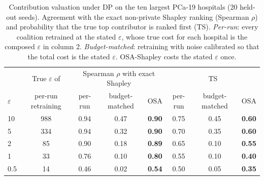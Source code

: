 \begin{table}[t]
\caption{Contribution valuation under DP on the ten largest PCa-19 hospitals (20 held-out seeds). Agreement with the exact non-private Shapley ranking (Spearman $\rho$) and probability that the true top contributor is ranked first (TS). \emph{Per-run}: every coalition retrained at the stated $\varepsilon$, whose true cost for each hospital is the composed $\varepsilon$ in column 2. \emph{Budget-matched}: retraining with noise calibrated so that the total cost is the stated $\varepsilon$. OSA-Shapley costs the stated $\varepsilon$ once.}
\centering\small
\begin{tabular}{lccccccc}
\toprule
 & True $\varepsilon$ of & \multicolumn{3}{c}{Spearman $\rho$ with exact Shapley} & \multicolumn{3}{c}{TS} \\
$\varepsilon$ & per-run retraining & per-run & budget-matched & OSA & per-run & budget-matched & OSA \\
\midrule
10 & 988 & 0.94 & 0.47 & \textbf{0.90} & 0.75 & 0.45 & \textbf{0.60} \\
5 & 334 & 0.94 & 0.32 & \textbf{0.90} & 0.70 & 0.35 & \textbf{0.60} \\
2 & 85 & 0.90 & 0.18 & \textbf{0.89} & 0.65 & 0.10 & \textbf{0.55} \\
1 & 33 & 0.76 & 0.10 & \textbf{0.80} & 0.55 & 0.10 & \textbf{0.40} \\
0.5 & 14 & 0.46 & 0.02 & \textbf{0.54} & 0.50 & 0.05 & \textbf{0.35} \\
\bottomrule
\end{tabular}
\label{tab:osa}
\end{table}
